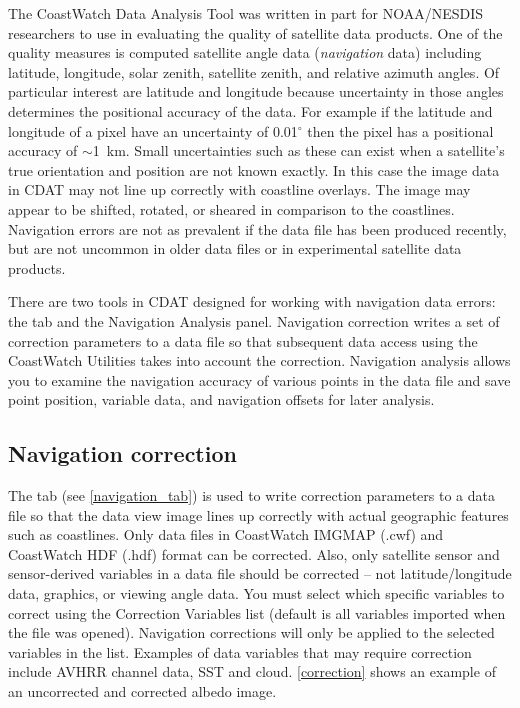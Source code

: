 The CoastWatch Data Analysis Tool was written in part for
NOAA/NESDIS researchers to use in evaluating the quality of
satellite data products.  One of the quality measures is computed
satellite angle data ({\em navigation} data) including latitude,
longitude, solar zenith, satellite zenith, and relative azimuth
angles.  Of particular interest are latitude and longitude because
uncertainty in those angles determines the positional accuracy of
the data.  For example if the latitude and longitude of a pixel
have an uncertainty of 0.01$^{\circ}$ then the pixel has a
positional accuracy of $\sim$1~km.  Small uncertainties such as
these can exist when a satellite's true orientation and position
are not known exactly. In this case the image data in CDAT may
not line up correctly with coastline overlays. The image may
appear to be shifted, rotated, or sheared in comparison to the
coastlines.  Navigation errors are not as prevalent if the data
file has been produced recently, but are not uncommon in older
data files or in experimental satellite data products.

There are two tools in CDAT designed for working with navigation
data errors: the 
tab and the {\gui Navigation Analysis} panel.  Navigation
correction writes a set of correction parameters to a data file
so that subsequent data access using the CoastWatch Utilities
takes into account the correction.  Navigation analysis allows
you to examine the navigation accuracy of various points in the
data file and save point position, variable data, and navigation
offsets for later analysis.

\subsection{Navigation correction}

The  tab (see
\autoref{navigation_tab}) is used to write correction parameters
to a data file so that the data view image lines up correctly
with actual geographic features such as coastlines.  Only data
files in CoastWatch IMGMAP (.cwf) and CoastWatch HDF (.hdf)
format can be corrected.  Also, only satellite sensor and
sensor-derived variables in a data file should be corrected --
not latitude/longitude data, graphics, or viewing angle data. You
must select which specific variables to correct using the
{\gui Correction Variables} list (default is all variables
imported when the file was opened).  Navigation corrections will
only be applied to the selected variables in the list.  Examples
of data variables that may require correction include AVHRR
channel data, SST and cloud. \autoref{correction} shows an
example of an uncorrected and corrected albedo image.


